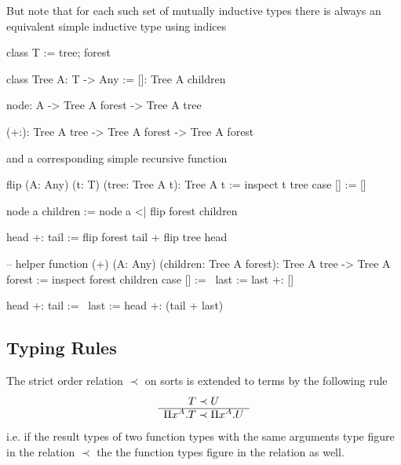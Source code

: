 But note that for each such set of mutually inductive types there is always an
equivalent simple inductive type using indices
%
\begin{alba}
    class T := tree; forest

    class Tree A: T -> Any :=
        []: Tree A children

        node: A -> Tree A forest -> Tree A tree

        (+:): Tree A tree -> Tree A forest -> Tree A forest
\end{alba}
%
and a corresponding simple recursive function
%
\begin{alba}
    flip (A: Any) (t: T) (tree: Tree A t): Tree A t
    :=
        inspect t tree case
            [] :=
                []

            node a children :=
                node a <| flip forest children

            head +: tail :=
                flip forest tail + flip tree head

    -- helper function
    (+) (A: Any) (children: Tree A forest): Tree A tree -> Tree A forest
    :=
        inspect
            forest children
        case
            [] :=
                \ last := last +: []

            head +: tail :=
                \ last := head +: (tail + last)
\end{alba}

\begin{alba}
\end{alba}






\subsection{Typing Rules}
\label{sec:typing-rules}

\begin{definition}
  The strict order relation $\prec$ on sorts is extended to terms by the following
  rule
  $$
  \begin{array}{c} T \prec U \\ \hline \Pi x^A.T \prec \Pi x^A. U\end{array}
  $$
  i.e. if the result types of two function types with the same arguments type
  figure in the relation $\prec$ the the function types figure in the relation
  as well.
\end{definition}

